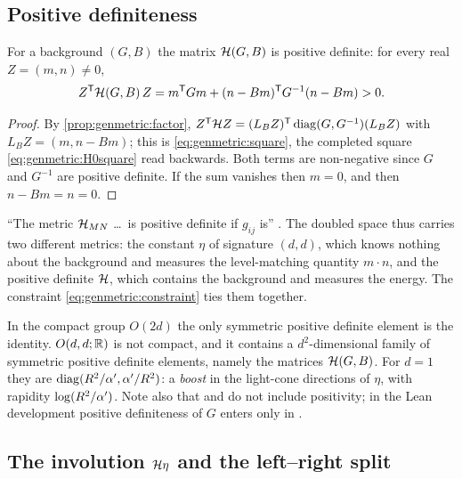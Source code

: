 \subsection{Positive definiteness}

\begin{proposition}\label{prop:genmetric:posdef}
For a background $(G,B)$ the matrix $\mathcal{H}(G,B)$ is positive definite: for every real
$Z=(m,n)\neq0$,
\begin{equation}\label{eq:genmetric:square}
 Z^{\mathsf T}\mathcal{H}(G,B)\,Z=m^{\mathsf T}Gm+(n-Bm)^{\mathsf T}G^{-1}(n-Bm)>0 .
\end{equation}
\end{proposition}
\begin{proof}
By \cref{prop:genmetric:factor}, $Z^{\mathsf T}\mathcal{H} Z=(L_BZ)^{\mathsf T}\operatorname{diag}(G,G^{-1})(L_BZ)$
with $L_BZ=(m,n-Bm)$; this is \eqref{eq:genmetric:square}, the completed square
\eqref{eq:genmetric:H0square} read backwards. Both terms are non-negative since $G$ and
$G^{-1}$ are positive definite. If the sum vanishes then $m=0$, and then $n-Bm=n=0$.
\end{proof}
\noindent ``The metric $\mathcal{H}_{MN}$ \dots\ is positive definite if $g_{ij}$ is''
. The doubled space thus carries two different metrics: the
constant $\eta$ of signature $(d,d)$, which knows nothing about the background and measures
the level-matching quantity $m\cdot n$, and the positive definite $\mathcal{H}$, which contains
the background and measures the energy. The constraint \eqref{eq:genmetric:constraint}
ties them together.

\begin{pitfallbox}
In the compact group $O(2d)$ the only symmetric positive definite element is the identity.
$O(d,d;\mathbb{R})$ is not compact, and it contains a $d^2$-dimensional family of symmetric positive
definite elements, namely the matrices $\mathcal{H}(G,B)$. For $d=1$ they are
$\operatorname{diag}(R^2/\alpha',\alpha'/R^2)$: a \emph{boost} in the light-cone directions of $\eta$, with
rapidity $\log(R^2/\alpha')$. Note also that  and
 do not include positivity; in the Lean development positive
definiteness of $G$ enters only in .
\end{pitfallbox}

\subsection{The involution \texorpdfstring{$\mathcal{H}\eta$}{H eta} and the left--right split}

